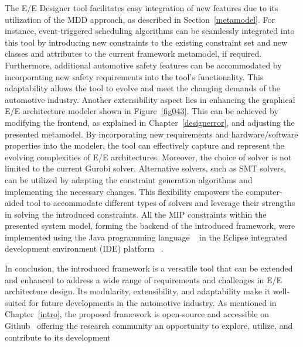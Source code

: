     The E/E Designer tool facilitates easy integration of new features due to its utilization of the MDD approach, as described in Section~\ref{metamodel}. For instance, event-triggered scheduling algorithms can be seamlessly integrated into this tool by introducing new constraints to the existing constraint set and new classes and attributes to the current framework metamodel, if required. Furthermore, additional automotive safety features can be accommodated by incorporating new safety requirements into the tool's functionality. This adaptability allows the tool to evolve and meet the changing demands of the automotive industry.
    Another extensibility aspect lies in enhancing the graphical E/E architecture modeler shown in Figure~\ref{fig043}. This can be achieved by modifying the frontend, as explained in Chapter~\ref{designerror}, and adjusting the presented metamodel. By incorporating new requirements and hardware/software properties into the modeler, the tool can effectively capture and represent the evolving complexities of E/E architectures.
    Moreover, the choice of solver is not limited to the current Gurobi solver. Alternative solvers, such as SMT solvers, can be utilized by adapting the constraint generation algorithms and implementing the necessary changes. This flexibility empowers the computer-aided tool to accommodate different types of solvers and leverage their strengths in solving the introduced constraints. All the MIP constraints within the presented system model, forming the backend of the introduced framework, were implemented using the Java programming language ~\cite{arnold2005java} in the Eclipse integrated development environment (IDE) platform ~\cite{eclipse}.

    In conclusion, the introduced framework is a versatile tool that can be extended and enhanced to address a wide range of requirements and challenges in E/E architecture design. Its modularity, extensibility, and adaptability make it well-suited for future developments in the automotive industry. As mentioned in Chapter~\ref{intro}, the proposed framework is open-source and accessible on Github~\cite{askaripoor2023designer} offering the research community an opportunity
    to explore, utilize, and contribute to its development
   
    
    
    
   
    
    
   

